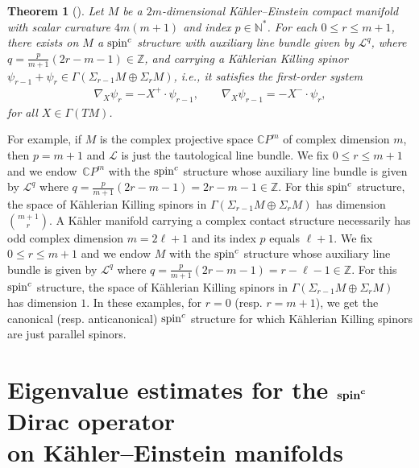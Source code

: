 \documentclass[pdftex]{sigma}
\numberwithin{equation}{section}
\newtheorem{thm}{Theorem}[section]
\theoremstyle{definition}
\begin{document}
\begin{thm}[] \label{KKSS}
Let $M$ be a $2m$-dimensional K\"ahler--Einstein compact mani\-fold with scalar
curvature $4m(m+1)$ and index $p \in  \mathbb N^*$. For each $0 \leq r \leq m+1$, there exists on $M$ a ${\mathop{\rm spin}^c}$ structure with auxiliary line bundle given by $\mathcal L^q$, where  $q = \frac{p}{m+1} (2r-m-1) \in \mathbb Z$, and carrying a K\"ahlerian Killing spinor $\psi_{r-1} + \psi_r \in \Gamma(\Sigma_{r-1} M \oplus \Sigma_{r} M)$, i.e.,  it satisfies the first-order system
\begin{gather*}
\nabla_X \psi_{r} = - X^+ \cdot \psi_{r-1},\qquad
\nabla_X \psi_{r-1}  = - X^-  \cdot \psi_{r},
\end{gather*}
for all $X \in \Gamma(TM)$.
\end{thm}


For example, if $M$ is the complex projective space $\mathbb C P^m$ of complex dimension $m$, then $p = m+1$ and $\mathcal L$ is just the tautological line bundle. We f\/ix $0 \leq r \leq m+1$ and we endow~$\mathbb C P^m$ with the ${\mathop{\rm spin}^c}$ structure whose auxiliary line bundle  is given by $\mathcal L^q$ where $q = \frac{p}{m+1} (2r-m-1) = 2r-m-1 \in \mathbb Z$. For this ${\mathop{\rm spin}^c}$ structure, the space of  K\"ahlerian Killing spinors   in $\Gamma(\Sigma_{r-1}M \oplus \Sigma_rM)$ has dimension $\binom{m+1}{r}$. A K\"ahler manifold carrying a complex contact structure necessarily has odd complex dimension $m = 2\ell+1$ and its index $p$ equals $\ell+1$.  We f\/ix $0 \leq r \leq m+1$ and we endow $M$ with the ${\mathop{\rm spin}^c}$ structure whose auxiliary line bundle is  given by $\mathcal L^q$ where $q = \frac{p}{m+1} (2r-m-1) = r-\ell-1 \in \mathbb Z$. For this ${\mathop{\rm spin}^c}$ structure, the space of  K\"ahlerian Killing spinors   in $\Gamma(\Sigma_{r-1} M\oplus \Sigma_{r}M)$ has dimension $1$.  In these examples, for $r=0$ (resp. $r = m+1$), we get the canonical (resp. anticanonical) ${\mathop{\rm spin}^c}$ structure for which K\"ahlerian Killing spinors are just parallel spinors.


\section[Eigenvalue estimates for the ${\mathop{\rm spin}^c}$ Dirac operator on K\"ahler--Einstein manifolds]{Eigenvalue estimates for the $\boldsymbol{{\mathop{\rm spin}^c}}$ Dirac operator\\ on K\"ahler--Einstein manifolds}\label{eigen}
\end{document}

